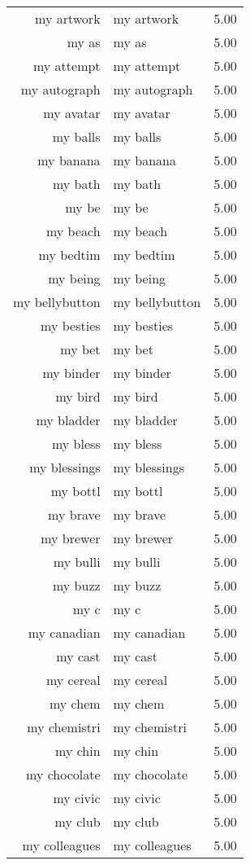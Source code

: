 \begin{table}[ht]
\begin{tabular}{rlr}
  my artwork & my artwork & 5.00 \\ 
  my as & my as & 5.00 \\ 
  my attempt & my attempt & 5.00 \\ 
  my autograph & my autograph & 5.00 \\ 
  my avatar & my avatar & 5.00 \\ 
  my balls & my balls & 5.00 \\ 
  my banana & my banana & 5.00 \\ 
  my bath & my bath & 5.00 \\ 
  my be & my be & 5.00 \\ 
  my beach & my beach & 5.00 \\ 
  my bedtim & my bedtim & 5.00 \\ 
  my being & my being & 5.00 \\ 
  my bellybutton & my bellybutton & 5.00 \\ 
  my besties & my besties & 5.00 \\ 
  my bet & my bet & 5.00 \\ 
  my binder & my binder & 5.00 \\ 
  my bird & my bird & 5.00 \\ 
  my bladder & my bladder & 5.00 \\ 
  my bless & my bless & 5.00 \\ 
  my blessings & my blessings & 5.00 \\ 
  my bottl & my bottl & 5.00 \\ 
  my brave & my brave & 5.00 \\ 
  my brewer & my brewer & 5.00 \\ 
  my bulli & my bulli & 5.00 \\ 
  my buzz & my buzz & 5.00 \\ 
  my c & my c & 5.00 \\ 
  my canadian & my canadian & 5.00 \\ 
  my cast & my cast & 5.00 \\ 
  my cereal & my cereal & 5.00 \\ 
  my chem & my chem & 5.00 \\ 
  my chemistri & my chemistri & 5.00 \\ 
  my chin & my chin & 5.00 \\ 
  my chocolate & my chocolate & 5.00 \\ 
  my civic & my civic & 5.00 \\ 
  my club & my club & 5.00 \\ 
  my colleagues & my colleagues & 5.00 \\ 

\end{tabular}
\end{table}
